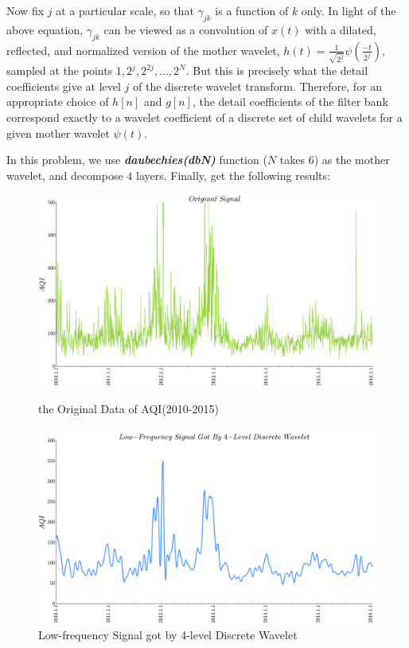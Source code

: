 \documentclass[a4paper,11pt]{article}
\begin{document}
\par Now fix $j$ at a particular scale, so that  $\gamma_{jk}$  is a function of $k$ only. In light of the above equation, $\gamma_{jk}$ can be viewed as a convolution of $x(t)$ with a dilated, reflected, and normalized version of the mother wavelet, $h(t) = \frac{1}{\sqrt{2^j}}\psi\left(\frac{-t}{2^j}\right)$, sampled at the points $1, 2^j, 2^{2j}, ..., 2^{N}$. But this is precisely what the detail coefficients give at level $j$ of the discrete wavelet transform. Therefore, for an appropriate choice of $h[n]$ and $g[n]$, the detail coefficients of the filter bank correspond exactly to a wavelet coefficient of a discrete set of child wavelets for a given mother wavelet $\psi(t)$.
\par In this problem, we use \textbf{\emph{daubechies(dbN)}} function ($N$ takes $6$) as the mother wavelet, and decompose $4$ layers. Finally, get the following results:

\begin{figure}[h]
  \centering %
  \begin{minipage}[t]{.49\linewidth}
  \includegraphics[width=1\textwidth]{./Pic/NO1/Trsorigin.png}
  \caption{the Original Data of AQI(2010-2015)}
  \label{fig:od}
  \end{minipage}
  \begin{minipage}[t]{.49\linewidth}
  
  \includegraphics[width=1\textwidth]{./Pic/NO1/Trslowf.png}
  \caption{Low-frequency Signal got by 4-level Discrete Wavelet}
  \label{fig:4-ld}
  \end{minipage}
\end{figure}
\end{document}
